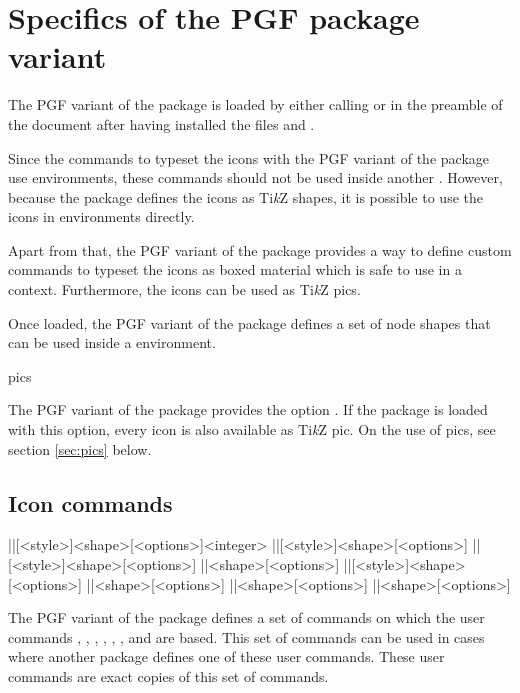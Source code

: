 \documentclass[a4paper]{article}
\begin{document}
\RenewCommandCopy\die\rpgiconsdie
\RenewCommandCopy\ability\rpgiconsability

\section{Specifics of the PGF package variant}

The PGF variant of the package is loaded by either calling \macro{\usepackage[pgf]{rpgicons}} or \macro{\usepackage{rpgicons-pgf}} in the preamble of the document after having installed the files  and .

Since the commands to typeset the icons with the PGF variant of the package use  environments, these commands should not be used inside another . However, because the package defines the icons as Ti\emph{k}Z shapes, it is possible to use the icons in  environments directly.

Apart from that, the PGF variant of the package provides a way to define custom commands to typeset the icons as boxed material which is safe to use in a  context. Furthermore, the icons can be used as Ti\emph{k}Z pics.

Once loaded, the PGF variant of the package defines a set of node shapes that can be used inside a  environment.

\begin{macrodef}pics\end{macrodef}
The PGF variant of the package provides the option . If the package is loaded with this option, every icon is also available as Ti\emph{k}Z pic. On the use of pics, see section \ref{sec:pics} below.

\subsection{Icon commands}

\begin{macrodef}
|\rpgiconsdie|[<style>]{<shape>}[<options>]{<integer>}
|\rpgiconsability|[<style>]{<shape>}[<options>]
|\rpgiconssaving|[<style>]{<shape>}[<options>]
|\rpgiconsspell|{<shape>}[<options>]
|\rpgiconsspellschool|[<style>]{<shape>}[<options>]
|\rpgiconsdamage|{<shape>}[<options>]
|\rpgiconsattack|{<shape>}[<options>]
|\rpgiconscondition|{<shape>}[<options>]
\end{macrodef}
The PGF variant of the package defines a set of commands on which the user commands \macro{\die}, \macro{\ability}, \macro{\saving}, \macro{\spell}, \macro{\spellschool}, \macro{\damage}, \macro{\attack} and \macro{\condition} are based. This set of commands can be used in cases where another package defines one of these user commands. These user commands are exact copies of this set of commands.
\end{document}

